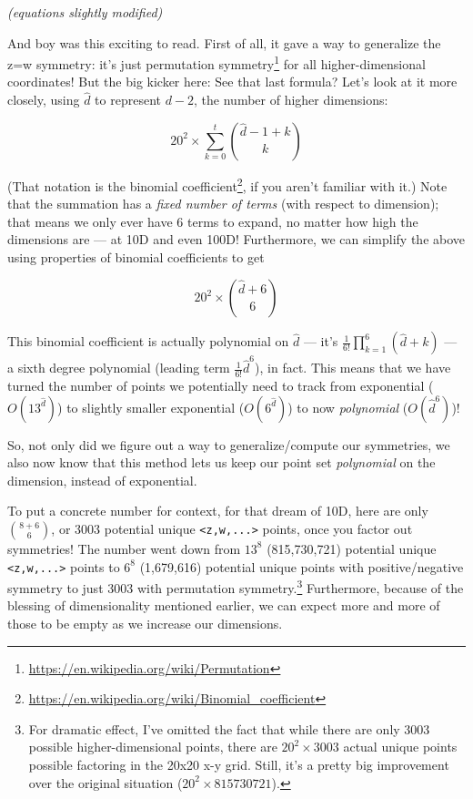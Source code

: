 \documentclass[]{article}
\renewcommand{\href}[2]{#2\footnote{\url{#1}}}
\begin{document}
\emph{(equations slightly modified)}

And boy was this exciting to read. First of all, it gave a way to generalize the
z=w symmetry: it's just
\href{https://en.wikipedia.org/wiki/Permutation}{permutation symmetry} for all
higher-dimensional coordinates! But the big kicker here: See that last formula?
Let's look at it more closely, using \(\hat{d}\) to represent \(d-2\), the
number of higher dimensions:

\[
20^2 \times \sum_{k=0}^{t} { {\hat{d}-1+k}\choose{k} }
\]

(That notation is the
\href{https://en.wikipedia.org/wiki/Binomial_coefficient}{binomial coefficient},
if you aren't familiar with it.) Note that the summation has a \emph{fixed
number of terms} (with respect to dimension); that means we only ever have 6
terms to expand, no matter how high the dimensions are --- at 10D and even 100D!
Furthermore, we can simplify the above using properties of binomial coefficients
to get

\[
20^2 \times { {\hat{d}+6}\choose{6} }
\]

This binomial coefficient is actually polynomial on \(\hat{d}\) --- it's
\(\frac{1}{6!} \prod_{k=1}^6 (\hat{d}+k)\) --- a sixth degree polynomial
(leading term \(\frac{1}{6!} \hat{d}^6\)), in fact. This means that we have
turned the number of points we potentially need to track from exponential
(\(O(13^{\hat{d}})\)) to slightly smaller exponential (\(O(6^{\hat{d}})\)) to
now \emph{polynomial} (\(O(\hat{d}^6)\))!

So, not only did we figure out a way to generalize/compute our symmetries, we
also now know that this method lets us keep our point set \emph{polynomial} on
the dimension, instead of exponential.

To put a concrete number for context, for that dream of 10D, here are only
\({ {8+6} \choose 6 }\), or 3003 potential unique
\texttt{\textless{}z,w,...\textgreater{}} points, once you factor out
symmetries! The number went down from \(13^8\) (815,730,721) potential unique
\texttt{\textless{}z,w,...\textgreater{}} points to \(6^8\) (1,679,616)
potential unique points with positive/negative symmetry to just 3003 with
permutation symmetry.\footnote{For dramatic effect, I've omitted the fact that
  while there are only 3003 possible higher-dimensional points, there are
  \(20^2 \times 3003\) actual unique points possible factoring in the 20x20 x-y
  grid. Still, it's a pretty big improvement over the original situation
  (\(20^2 \times 815730721\)).} Furthermore, because of the blessing of
dimensionality mentioned earlier, we can expect more and more of those to be
empty as we increase our dimensions.
\end{document}
